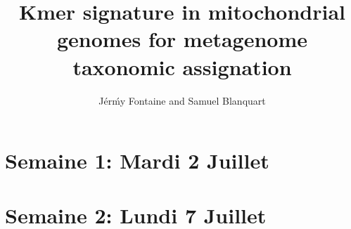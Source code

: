 \documentclass[10pt,a4paper]{article}
\title{Kmer signature in mitochondrial genomes for metagenome taxonomic assignation}
\author{J\'er\'my Fontaine and Samuel Blanquart}
\begin{document}
\maketitle

\section{Semaine 1: Mardi 2 Juillet}



\section{Semaine 2: Lundi 7 Juillet}



\end{document}

